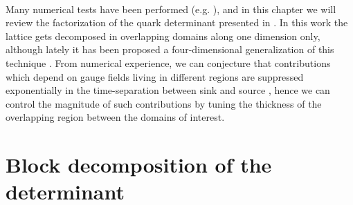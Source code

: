 \\ Many numerical tests have been performed (e.g. \cite{Giusti_2018, Dalla_Brida_2021}), and in this chapter we will review the factorization of the quark determinant presented in \cite{C__2017}. In this work the lattice gets decomposed in overlapping domains along one dimension only, although lately it has been proposed a four-dimensional generalization of this technique \cite{Giusti_2022}. From numerical experience, we can conjecture that contributions which depend on gauge fields living in different regions are suppressed exponentially in the time-separation between sink and source \cite{C__2016}, hence we can control the magnitude of such contributions by tuning the thickness of the overlapping region between the domains of interest.

 \section{Block decomposition of the determinant}

